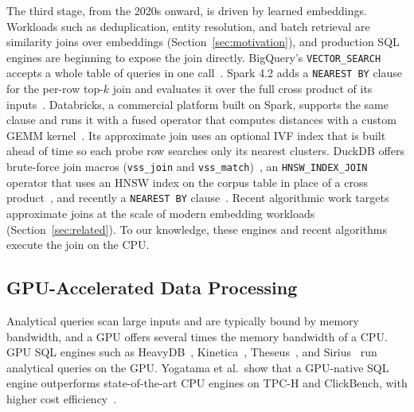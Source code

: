 The third stage, from the 2020s onward, is driven by learned embeddings.
Workloads such as deduplication, entity resolution, and batch retrieval are similarity joins over embeddings (Section~\ref{sec:motivation}), and production SQL engines are beginning to expose the join directly.
BigQuery's \texttt{VECTOR\_SEARCH} accepts a whole table of queries in one call~\cite{BigQueryVectorSearchFn}.
Spark 4.2 adds a \texttt{NEAREST BY} clause for the per-row top-$k$ join and evaluates it over the full cross product of its inputs~\cite{ApacheSparkJIRA56395, SparkNearestByJoin26}.
Databricks, a commercial platform built on Spark, supports the same clause and runs it with a fused operator that computes distances with a custom GEMM kernel~\cite{DatabricksNearestByJoinBlog26}.
Its approximate join uses an optional IVF index that is built ahead of time so each probe row searches only its nearest clusters.
DuckDB offers brute-force join macros (\texttt{vss\_join} and \texttt{vss\_match})~\cite{DuckDBVSS}, an \texttt{HNSW\_INDEX\_JOIN} operator that uses an HNSW index on the corpus table in place of a cross product~\cite{DuckDBVSSBlog24}, and recently a \texttt{NEAREST BY} clause~\cite{DuckDBNearestByPR24137}.
Recent algorithmic work targets approximate joins at the scale of modern embedding workloads~\cite{XieSimJoin25, ChenDiskJoin25, KimVectorJoin26} (Section~\ref{sec:related}).
To our knowledge, these engines and recent algorithms execute the join on the CPU\@.

\subsection{GPU-Accelerated Data Processing}\label{subsec:gpu-data-processing}

Analytical queries scan large inputs and are typically bound by memory bandwidth, and a GPU offers several times the memory bandwidth of a CPU\@.
GPU SQL engines such as HeavyDB~\cite{HeavyDB}, Kinetica~\cite{Kinetica}, Theseus~\cite{AramburuTheseus25}, and Sirius~\cite{Yogatama26} run analytical queries on the GPU.
Yogatama et al.\ show that a GPU-native SQL engine outperforms state-of-the-art CPU engines on TPC-H and ClickBench, with higher cost efficiency~\cite{Yogatama26, SiriusClickBench25}.

